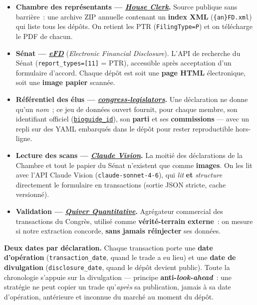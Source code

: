 \documentclass[11pt,a4paper]{article}
\newcommand{\co}[1]{\texttt{\small #1}}
\begin{document}
\begin{itemize}[leftmargin=1.4em]
\item \textbf{Chambre des représentants — \href{https://disclosures-clerk.house.gov/FinancialDisclosure}{\emph{House Clerk}}.} Source publique sans barrière~: une archive
ZIP annuelle contenant un \textbf{index XML} (\co{\{an\}FD.xml}) qui liste tous les dépôts. On retient les
PTR (\co{FilingType=P}) et on télécharge le PDF de chacun.
\item \textbf{Sénat — \href{https://efdsearch.senate.gov/search/home/}{\emph{eFD}}} (\emph{Electronic Financial Disclosure}). L'API de recherche du Sénat
(\co{report_types=[11]} = PTR), accessible après acceptation d'un formulaire d'accord. Chaque dépôt est
soit une \textbf{page HTML} électronique, soit une \textbf{image papier} scannée.
\item \textbf{Référentiel des élus — \href{https://github.com/unitedstates/congress-legislators}{\emph{congress-legislators}}.}\label{sec:reference} Une déclaration ne
donne qu'un \emph{nom}~; ce jeu de données ouvert fournit, pour chaque membre, son identifiant officiel
(\href{https://bioguide.congress.gov/}{\co{bioguide_id}}), son \textbf{parti} et ses \textbf{commissions} — avec un repli sur des YAML embarqués
dans le dépôt pour rester reproductible hors-ligne.
\item \textbf{Lecture des scans — \href{https://www.anthropic.com}{\emph{Claude Vision}}.}\label{sec:vision} La moitié des déclarations de la
Chambre et tout le papier du Sénat n'existent que comme \textbf{images}. On les lit avec l'API Claude
Vision (\co{claude-sonnet-4-6}), qui \emph{lit} \textbf{et} \emph{structure} directement le formulaire en
transactions (sortie JSON stricte, cache versionné).
\item \textbf{Validation — \href{https://www.quiverquant.com/congresstrading/}{\emph{Quiver Quantitative}}.} Agrégateur commercial des transactions du Congrès,
utilisé comme \textbf{vérité-terrain externe}~: on mesure si notre extraction concorde, \textbf{sans jamais
réinjecter} ses données.
\end{itemize}

\textbf{Deux dates par déclaration.} Chaque transaction porte une \textbf{date d'opération}
(\co{transaction_date}, quand le trade a eu lieu) et une \textbf{date de divulgation} (\co{disclosure_date},
quand le dépôt devient public). Toute la chronologie s'appuie sur la divulgation — principe
\textbf{anti-\emph{look-ahead}}~: une stratégie ne peut copier un trade qu'\emph{après} sa publication,
jamais à sa date d'opération, antérieure et inconnue du marché au moment du dépôt.
\end{document}
